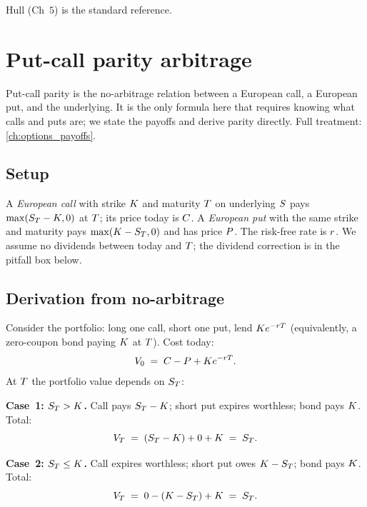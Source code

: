 Hull \citeHull{} (Ch~$5$) is the standard reference.

\section{Put-call parity arbitrage}
\label{sec:ch13_put_call_parity}

Put-call parity is the no-arbitrage relation between a European
call, a European put, and the underlying. It is the only formula
here that requires knowing what calls and puts are; we state the
payoffs and derive parity directly. Full treatment:
\cref{ch:options_payoffs}.

\subsection{Setup}
\label{sec:ch13_parity_setup}

A \emph{European call} with strike $K$ and maturity
$T$ on underlying $S$ pays $\max(S_T - K, 0)$
at $T$; its price today is $C$. A \emph{European put}
with the same strike and maturity pays $\max(K - S_T,
0)$ and has price $P$. The risk-free rate is $r$. We
assume no dividends between today and $T$; the dividend
correction is in the pitfall box below.

\subsection{Derivation from no-arbitrage}
\label{sec:ch13_parity_derivation}

Consider the portfolio: long one call, short one put, lend
$K e^{-r T}$ (equivalently, a zero-coupon bond
paying $K$ at $T$). Cost today:
\begin{equation*}
  V_0 \;=\; C - P + K e^{-r T}.
\end{equation*}
At $T$ the portfolio value depends on $S_T$:

\textbf{Case~1: $S_T > K$.} Call pays $S_T -
K$; short put expires worthless; bond pays $K$.
Total:
\begin{equation*}
  V_T \;=\; (S_T - K) + 0 + K \;=\; S_T.
\end{equation*}

\textbf{Case~2: $S_T \leq K$.} Call expires worthless;
short put owes $K - S_T$; bond pays $K$. Total:
\begin{equation*}
  V_T \;=\; 0 - (K - S_T) + K \;=\; S_T.
\end{equation*}

